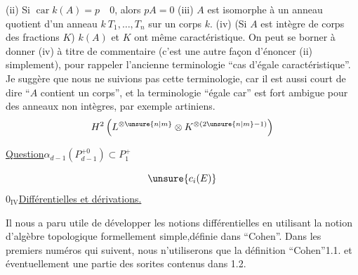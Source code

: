 (ii) Si $\operatorname{car}k(A)=p\quad0$, alors $pA=0$ (iii) $A$ est isomorphe à un anneau quotient d'un anneau $k\ T_1,\ldots,T_n$ sur un corps $k$. (iv) (Si $A$ est intègre de corps des fractions $K$) $k(A)$ et $K$ ont même caractéristique. On peut se borner à donner (iv) à titre de commentaire (c'est une autre façon d'énoncer (ii) simplement), pour  rappeler l'ancienne terminologie ``cas d'égale caractéristique''. Je suggère que nous ne suivions pas cette terminologie, car il est aussi court de dire ``$A$ contient un corps'', et la terminologie ``égale car'' est fort ambigue pour des anneaux non intègres, par exemple artiniens.
\[H^2\left(L^{\otimes\unsure{n|m}}\otimes K^{\otimes(2\unsure{n|m}-1)}\right)\]
\hrulefill
{}

\uline{Question}\quad $\alpha_{d-1}(P_{d-1}^{+0})\subset P_1^+$


\[\unsure{c_i(E)}\]
$0_{\mathrm{IV}}$\quad\uline{Différentielles et dérivations.}

 Il nous a paru utile de développer les notions différentielles en utilisant la notion d'algèbre topologique formellement simple,définie dans ``Cohen''. Dans les premiers numéros qui suivent, nous n'utiliserons que la définition ``Cohen''1.1. et éventuellement une partie des sorites contenus dans 1.2.

